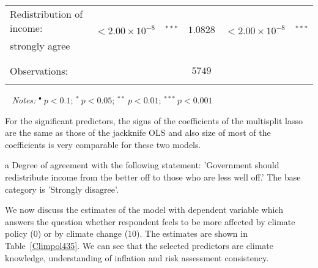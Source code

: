 \documentclass[a4paper,12pt]{article}
\begin{document}
{\begin{threeparttable}
\begin{small}
\begin{tabular}{lclrcl}
    \\
  Redistribution of income:& \multirow{2}{*}{$<2.00\times 10^{-8}$}&\multirow{2}{*}{$^{***}$}&\multirow{2}{*}{$1.0828$}&\multirow{2}{*}{$<2.00\times 10^{-8}$}&\multirow{2}{*}{$^{***}$}\\
\hspace{0.6cm}strongly agree\tnote{a}&& &&&\\%
\\
\hline
\vspace{-0.4cm} \\ Observations:&    \multicolumn{5}{c}{$5749$} \\  \vspace{-0.4cm}
\\
\hline
\end{tabular} 
\end{small}
 \begin{tablenotes}
  \begin{footnotesize}
   \item[~]\textit{Notes:} \hspace{0.2cm}$^{\bullet}~p<0.1$; $^{*}~p<0.05$; $^{**}~p<0.01$; $^{***}~p<0.001$
  \begin{adjustwidth}{1cm}{} \item For the significant predictors, the signs of the coefficients of the multisplit lasso are the same as those of the jackknife OLS and also size of most of the coefficients is very comparable for these two models.

 \item[a] Degree of agreement with the following statement: 'Government should redistribute income from the better off to those who are less well off.' The base category is 'Strongly disagree'.
     \end{adjustwidth}
 \singlespacing
  \end{footnotesize}
\end{tablenotes}
  \end{threeparttable} 
\par}
\linespread{1}

\hspace{1cm}

We now discuss the estimates of the model with dependent variable which answers the question whether respondent feels to be more affected by climate policy ($0$) or by climate change ($10$). The estimates are shown in Table~\ref{Climpol435}. We can see that the selected predictors are climate knowledge, understanding of inflation and risk assessment consistency.
\end{document}
